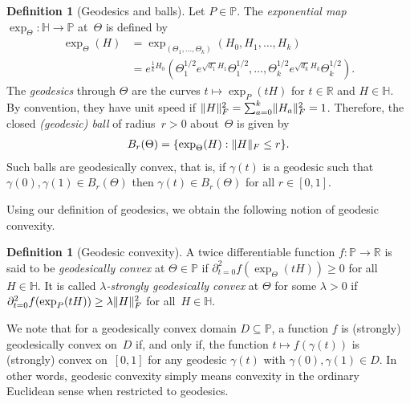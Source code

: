 \documentclass[aos]{imsart}
\theoremstyle{definition}
\newtheorem{definition}[theorem]{Definition}
\numberwithin{equation}{section}
\DeclarePairedDelimiter{\norm}{\lVert}{\rVert}
\newcommand{\R}{{\mathbb{R}}}
\renewcommand{\P}{{\mathbb{P}}}
\renewcommand{\H}{{\mathbb{H}}}
\begin{document}
\begin{definition}[Geodesics and balls]
Let $P\in\P$.
The \emph{exponential map} $\exp_\Theta \colon \H \to \P$ at~$\Theta$ is defined by
\begin{align*}
  \exp_\Theta(H) &= \exp_{(\Theta_1, \dots, \Theta_k)}(H_0, H_1,\dots,H_k)\\
  & =  e^{\frac{1}{k}H_0}\left( \Theta_1^{1/2} e^{\sqrt{d_1} H_1} \Theta_1^{1/2}, \dots, \Theta_k^{1/2} e^{\sqrt{d_k} H_k} \Theta_k^{1/2} \right).
\end{align*}
The \emph{geodesics} through $\Theta$ are the curves $t \mapsto \exp_P(t H)$ for $t\in\R$ and $H\in\H$.
By convention, they have unit speed if $\norm{H}_F^2 = \sum_{a=0}^k \norm{H_a}_F^2 = 1$.
Therefore, the closed \emph{(geodesic) ball} of radius~$r>0$ about~$\Theta$ is given by
\begin{align*}
  B_r(\Theta) = \{ \exp_\Theta(H) : \norm H_F \leq r \}.
\end{align*}
Such balls are geodesically convex, that is, if $\gamma(t)$ is a geodesic such that $\gamma(0),\gamma(1) \in B_r(\Theta)$ then $\gamma(t) \in B_r(\Theta)$ for all $r\in[0,1]$.

\end{definition}

Using our definition of geodesics, we obtain the following notion of geodesic convexity.

\begin{definition}[Geodesic convexity]
A twice differentiable function $f\colon \P \to \R$ is said to be \emph{geodesically convex} at $\Theta\in\P$ if $\partial^2_{t=0} f(\exp_\Theta(tH)) \geq 0$ for all~$H\in\H$.
It is called \emph{$\lambda$-strongly geodesically convex} at $\Theta$ for some $\lambda>0$ if $\partial^2_{t=0} f(\exp_P(tH)) \geq \lambda \norm H_F^2$ for all~$H\in\H$.

We note that for a geodesically convex domain $D \subseteq \P$, a function $f$ is (strongly) geodesically convex on~$D$ if, and only if, the function $t \mapsto f(\gamma(t))$ is (strongly) convex on~$[0,1]$ for any geodesic $\gamma(t)$ with $\gamma(0),\gamma(1)\in D$.
In other words, geodesic convexity simply means convexity in the ordinary Euclidean sense when restricted to geodesics.

\end{definition}
\end{document}
